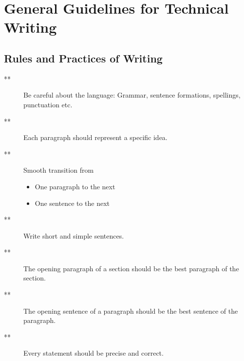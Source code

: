 \documentclass[]{report}
\begin{document}
  \chapter{General Guidelines for Technical Writing}
  \section{Rules and Practices of Writing}
  \begin{description}
  \item[**   ] Be careful about the language: Grammar, sentence
formations, spellings, punctuation etc.
\item[**   ] Each paragraph should represent a specific idea.
\item[**  ] Smooth transition from
\begin{itemize}
\item One paragraph to the next
\item One sentence to the next
\end{itemize}
\item[**  ] Write short and simple sentences.
\item[**  ] The opening paragraph of a section should be the best
paragraph of the section.
\item[**  ] The opening sentence of a paragraph should be the best
sentence of the paragraph.
\item[**  ] Every statement should be precise and correct.
  

\end{description}
\end{document}
